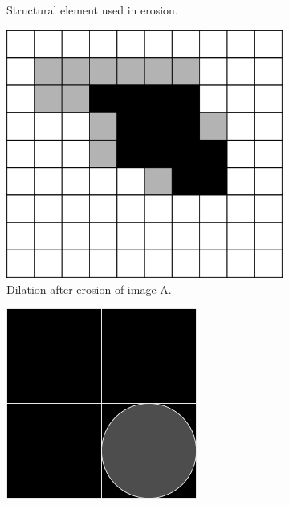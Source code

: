 \documentclass[
  digital,     %
  oneside,     %
  nosansbold,  %
  nocolorbold, %
  lof,         %
  lot,         %
]{fithesis4}
\begin{document}
\begin{figure}
\begin{subfigure}[t]{0.2\textwidth}
        \caption{Structural element used in erosion.}
        \label{fig:opening_erosion_se}
    \end{subfigure}
    \begin{subfigure}[t]{0.4\textwidth}
        \centering
        \includegraphics[width=\textwidth]{resources/inkscape/opening_dilation.png}
        \caption{Dilation after erosion of image A.}
        \label{fig:opening_dilation}
    \end{subfigure}
    \begin{subfigure}[t]{0.2\textwidth}
        \centering
        \includegraphics[width=\textwidth]{resources/inkscape/opening_dilation_se.png}

\end{subfigure}
\end{figure}
\end{document}
